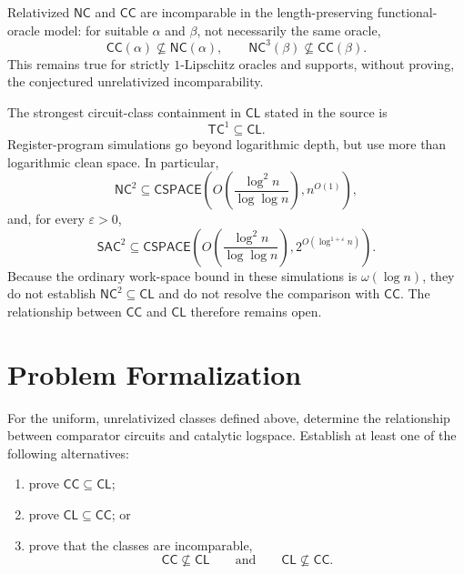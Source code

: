 \documentclass[10pt,a4paper]{article}
\theoremstyle{definition}
\newcommand{\CC}{\mathsf{CC}}
\newcommand{\CL}{\mathsf{CL}}
\newcommand{\NC}{\mathsf{NC}}
\newcommand{\TC}{\mathsf{TC}}
\newcommand{\SAC}{\mathsf{SAC}}
\newcommand{\CSPACE}{\mathsf{CSPACE}}
\begin{document}
Relativized $\NC$ and $\CC$ are incomparable in the length-preserving
functional-oracle model: for suitable $\alpha$ and $\beta$, not necessarily
the same oracle,
\begin{equation}
  \CC(\alpha)\not\subseteq\NC(\alpha),
  \qquad
  \NC^3(\beta)\not\subseteq\CC(\beta).
\end{equation}
This remains true for strictly $1$-Lipschitz oracles and supports, without
proving, the conjectured unrelativized incomparability.

The strongest circuit-class containment in $\CL$ stated in the source is
\begin{equation}
  \TC^1\subseteq\CL.
\end{equation}
Register-program simulations go beyond logarithmic depth, but use more than
logarithmic clean space. In particular,
\begin{equation}
  \NC^2
  \subseteq
  \CSPACE\left(
    O\left(\frac{\log^2n}{\log\log n}\right),
    n^{O(1)}
  \right),
\end{equation}
and, for every $\varepsilon>0$,
\begin{equation}
  \SAC^2
  \subseteq
  \CSPACE\left(
    O\left(\frac{\log^2n}{\log\log n}\right),
    2^{O(\log^{1+\varepsilon}n)}
  \right).
\end{equation}
Because the ordinary work-space bound in these simulations is
$\omega(\log n)$, they do not establish $\NC^2\subseteq\CL$ and do not resolve
the comparison with $\CC$. The relationship between $\CC$ and $\CL$ therefore
remains open.

\section{Problem Formalization}

For the uniform, unrelativized classes defined above, determine the
relationship between comparator circuits and catalytic logspace. Establish at
least one of the following alternatives:
\begin{enumerate}
  \item prove $\CC\subseteq\CL$;
  \item prove $\CL\subseteq\CC$; or
  \item prove that the classes are incomparable,
  \begin{equation}
    \CC\not\subseteq\CL
    \qquad\text{and}\qquad
    \CL\not\subseteq\CC.
  \end{equation}
\end{enumerate}
\end{document}

